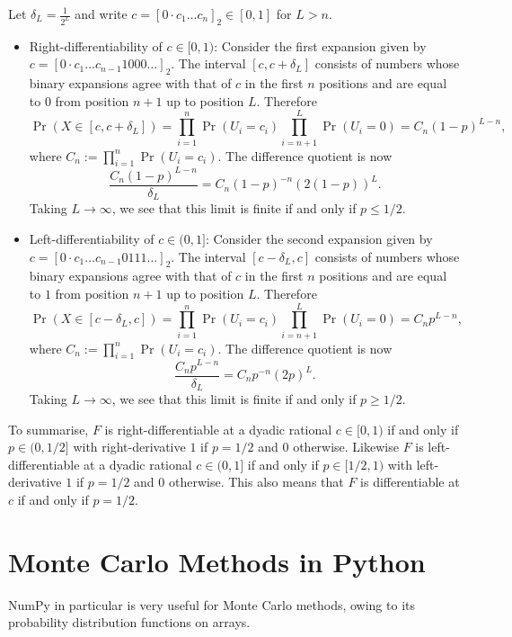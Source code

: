 \documentclass{article}
\begin{document}
Let \(\delta_L = \frac{1}{2^L}\) and write \(c = [0 \cdot c_1 \dots c_n]_2 \in [0,1]\) for \(L > n\).

\begin{itemize}
    \item Right-differentiability of \(c \in [0, 1)\): Consider the first expansion given by \(c = [0 \cdot c_1 \dots c_{n-1}1000 \dots]_2\). The interval \([c, c + \delta_L]\) consists of numbers whose binary expansions agree with that of \(c\) in the first \(n\) positions and are equal to \(0\) from position \(n+1\)  up to position \(L\). Therefore
    \[ \Pr(X \in [c, c+\delta_L]) = \prod_{i=1}^n \Pr(U_i = c_i) \prod_{i=n+1}^L \Pr(U_i = 0) = C_n (1-p)^{L-n}, \]
    where \(C_n := \prod_{i=1}^n \Pr(U_i = c_i)\). The difference quotient is now
    \[ \frac{C_n (1-p)^{L-n}}{\delta_L} = C_n (1-p)^{-n} (2(1-p))^L. \]
    Taking \(L \to \infty\), we see that this limit is finite if and only if \(p \leq 1/2\).
    
    \item Left-differentiability of \(c \in (0, 1]\): Consider the second expansion given by \(c = [0 \cdot c_1 \dots c_{n-1}0111 \dots]_2\). The interval \([c - \delta_L, c]\) consists of numbers whose binary expansions agree with that of \(c\) in the first \(n\) positions and are equal to \(1\) from position \(n+1\)  up to position \(L\). Therefore
    \[ \Pr(X \in [c - \delta_L, c]) = \prod_{i=1}^n \Pr(U_i = c_i) \prod_{i=n+1}^L \Pr(U_i = 0) = C_n p^{L-n}, \]
    where \(C_n := \prod_{i=1}^n \Pr(U_i = c_i)\). The difference quotient is now
    \[ \frac{C_n p^{L-n}}{\delta_L} = C_n p^{-n} (2p)^L. \]
    Taking \(L \to \infty\), we see that this limit is finite if and only if \(p \geq 1/2\).
\end{itemize}

To summarise, \(F\) is right-differentiable at a dyadic rational \(c \in [0,1)\) if and only if \(p \in (0, 1/2]\) with right-derivative \(1\) if \(p = 1/2\) and \(0\) otherwise. Likewise \(F\) is left-differentiable at a dyadic rational \(c \in (0,1]\) if and only if \(p \in [1/2, 1)\) with left-derivative \(1\) if \(p = 1/2\) and \(0\) otherwise. This also means that \(F\) is differentiable at \(c\) if and only if \(p = 1/2\).

\section{Monte Carlo Methods in Python}

NumPy in particular is very useful for Monte Carlo methods, owing to its probability distribution functions on arrays.
\end{document}
